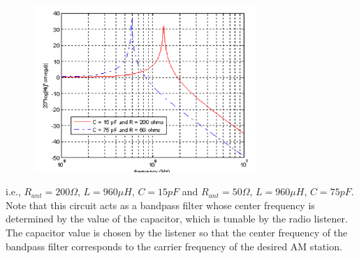 \documentclass[utf8]{article}
\begin{document}
{	\begin{figure}[H]
		\begin{small}
			\begin{center}
				\includegraphics[width=0.75\textwidth]{figures/Figure3.png}
			\end{center}
			\caption{}
			\label{fig:front-end}
		\end{small}
	\end{figure}

	i.e., $R_{ant} = 200 \Omega$, $L = 960 \mu H$, $C = 15 pF$ and $R_{ant} = 50 \Omega$, $L = 960 \mu H$, $C = 75 pF$. Note that this circuit acts as a bandpass filter whose center frequency is determined by the value of the capacitor, which is tunable by the radio listener. The capacitor value is chosen by the listener so that the center frequency of the bandpass filter corresponds to the carrier frequency of the desired AM station.
}
\end{document}

